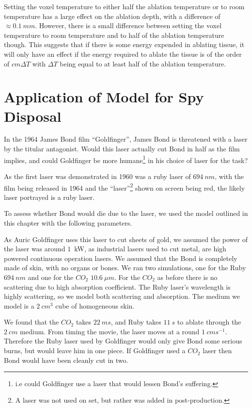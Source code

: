 Setting the voxel temperature to either half the ablation temperature or to room temperature has a large effect on the ablation depth, with a difference of $\approx 0.1~mm$.
However, there is a small difference between setting the voxel temperature to room temperature and to half of the ablation temperature though.
This suggests that if there is some energy expended in ablating tissue, it will only have an effect if the energy required to ablate the tissue is of the order of $cm\Delta T$ with $\Delta T$ being equal to at least half of the ablation temperature.

\section{Application of Model for Spy Disposal}

In the 1964 James Bond film ``Goldfinger'', James Bond is threatened with a laser by the titular antagonist.
Would this laser actually cut Bond in half as the film implies, and could Goldfinger be more humane\footnote{i.e could Goldfinger use a laser that would lessen Bond's suffering.} in his choice of laser for the task?

As the first laser was demonstrated in 1960 was a ruby laser of $694~nm$, with the film being released in 1964 and the ``laser''\footnote{A laser was not used on set, but rather was added in post-production.} shown on screen being red, the likely laser portrayed is a ruby laser.

To assess whether Bond would die due to the laser, we used the model outlined in this chapter with the following parameters.

As Auric Goldfinger uses this laser to cut sheets of gold, we assumed the power of the laser was around $1$~kW, as industrial lasers used to cut metal, are high powered continuous operation lasers.
We assumed that the Bond is completely made of skin, with no organs or bones.
We ran two simulations, one for the Ruby $694~nm$ and one for the $CO_2$ $10.6~\mu m$.
For the $CO_2$ as before there is no scattering due to high absorption coefficient. The Ruby laser's wavelength is highly scattering, so we model both scattering and absorption.
The medium we model is a $2~cm^3$ cube of homogeneous skin.

We found that the $CO_2$ takes $22~ms$, and Ruby takes $11~s$ to ablate through the $2~cm$ medium.
From timing the movie, the laser moves at a round $1~cms^{-1}$.
Therefore the Ruby laser used by Goldfinger would only give Bond some serious burns, but would leave him in one piece.
If Goldfinger used a $CO_2$ laser then Bond would have been cleanly cut in two.


